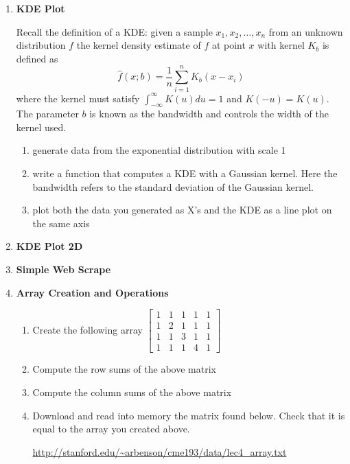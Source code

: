 \documentclass{article}
\begin{document}
\pagestyle{fancy}
\begin{enumerate}

\item \textbf{KDE Plot}

Recall the definition of a KDE: given a sample $x_1, x_2, \dots, x_n$ from an unknown distribution $f$ the kernel density estimate of $f$ at point $x$ with kernel $K_b$ is defined as 
$$\hat{f}(x;b) = \frac{1}{n}\sum_{i=1}^{n}K_b(x-x_i)$$
where the kernel must satisfy $\int_{-\infty}^{\infty}K(u)du = 1$ and $K(-u) = K(u).$ The parameter $b$ is known as the bandwidth and controls the width of the kernel used. 
\begin{enumerate}
\item generate data from the exponential distribution with scale 1 
\item write a function that computes a KDE with a Gaussian kernel. Here the bandwidth refers to the standard deviation of the Gaussian kernel.
\item plot both the data you generated as X's and the KDE as a line plot on the same axis
\end{enumerate}







\item \textbf{KDE Plot 2D}

\item \textbf{Simple Web Scrape}



\item \textbf{Array Creation and Operations}
\begin{enumerate}
\item 
Create the following array
$\begin{bmatrix}
1 & 1 & 1 & 1 & 1\\
1 & 2 & 1 & 1 & 1\\
1 & 1 & 3 & 1 & 1\\
1 & 1 & 1 & 4 & 1
\end{bmatrix}$
\item  Compute the row sums of the above matrix 
\item Compute the column sums of the above matrix
\item
Download and read into memory the matrix found below. Check that it is equal to the array you created above. 
\begin{center}
\url{http://stanford.edu/~arbenson/cme193/data/lec4_array.txt}
\end{center}
\end{enumerate}


\end{enumerate}
\end{document}
